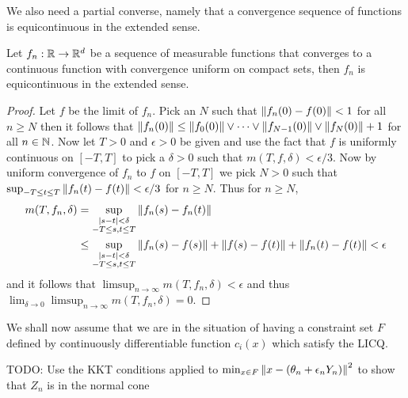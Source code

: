We also need a partial converse, namely that a convergence sequence of functions is equicontinuous in the extended sense.
\begin{prop}\label{PartialConverseExtendedArzelaAscoli}Let $f_n : \mathbb{R} \to \mathbb{R}^d$ be a sequence of measurable functions that converges to a continuous function with convergence uniform on compact sets, then $f_n$ is equicontinuous in the extended sense.
\end{prop}
\begin{proof}
Let $f$ be the limit of $f_n$.  Pick an $N$ such that $\left \lVert f_n(0) - f(0) \right \rVert < 1$ for all $n \geq N$ then it follows that $\left \lVert f_n(0) \right \rVert \leq \left \lVert f_0(0) \right \rVert \vee \dotsb \vee \left \lVert f_{N-1}(0) \right \rVert \vee \left \lVert f_N(0) \right \rVert + 1$ for all $n \in \mathbb{N}$.  Now let $T > 0$ and $\epsilon > 0$ be given and use the fact that $f$ is uniformly continuous on $[-T,T]$ to pick 
a $\delta > 0$ such that $m(T, f, \delta) < \epsilon/3$.  Now by uniform convergence of $f_n$ to $f$ on $[-T,T]$ we pick $N > 0$ such that $\sup_{-T \leq t \leq T} \left \lVert f_n(t) - f(t) \right \rVert < \epsilon/3$ for $n \geq N$.  Thus for $n \geq N$,
\begin{align*}
m(T,f_n,\delta) &= \sup_{\substack{
\left \vert s -t \right \vert < \delta \\
-T \leq s,t \leq T}} \left \lVert f_n(s) - f_n(t) \right \rVert \\
&\leq \sup_{\substack{
\left \vert s -t \right \vert < \delta \\
-T \leq s,t \leq T}} \left \lVert f_n(s) - f(s) \right \rVert + \left \lVert f(s) - f(t) \right \rVert + \left \lVert f_n(t) - f(t) \right \rVert < \epsilon
\end{align*}
and it follows that $\limsup_{n \to \infty} m(T, f_n, \delta) < \epsilon$ and thus $\lim_{\delta \to 0} \limsup_{n \to \infty} m(T, f_n, \delta) = 0$.
\end{proof}

We shall now assume that we are in the situation of having a constraint set $F$ defined by continuously differentiable function $c_i(x)$ which satisfy the LICQ.  

TODO:  Use the KKT  conditions applied to $\min_{x \in F} \left \lVert x - (\theta_n + \epsilon_n Y_n) \right \rVert^2$ to show that $Z_n$ is in the normal cone 


